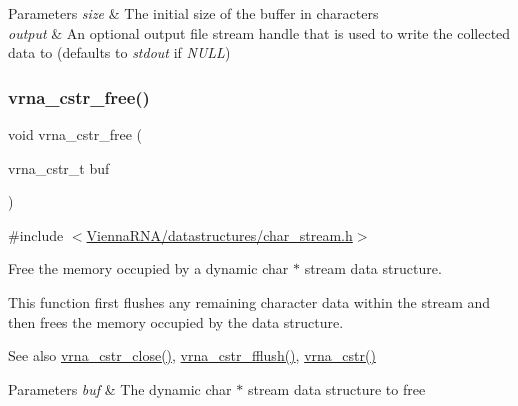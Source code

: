 \begin{DoxyParams}{Parameters}
{\em size} & The initial size of the buffer in characters \\
\hline
{\em output} & An optional output file stream handle that is used to write the collected data to (defaults to {\itshape stdout} if {\itshape N\+U\+LL}) \\
\hline
\end{DoxyParams}
\mbox{\label{group__buffer__utils_ga7ec48ec280f699928c70428cc245dc77}} 
\subsubsection{\texorpdfstring{vrna\_cstr\_free()}{vrna\_cstr\_free()}}
{\footnotesize\ttfamily void vrna\+\_\+cstr\+\_\+free (\begin{DoxyParamCaption}\item[{vrna\+\_\+cstr\+\_\+t}]{buf }\end{DoxyParamCaption})}



{\ttfamily \#include $<$\mbox{\hyperlink{datastructures_2char__stream_8h}{Vienna\+R\+N\+A/datastructures/char\+\_\+stream.\+h}}$>$}



Free the memory occupied by a dynamic char $\ast$ stream data structure. 

This function first flushes any remaining character data within the stream and then free\textquotesingle{}s the memory occupied by the data structure.

\begin{DoxySeeAlso}{See also}
\mbox{\hyperlink{group__buffer__utils_ga5a3f6a0a73b3d2d38fe011cdaed0ad28}{vrna\+\_\+cstr\+\_\+close()}}, \mbox{\hyperlink{group__buffer__utils_gab59ad4781f7de960bdd1af5b1965c94b}{vrna\+\_\+cstr\+\_\+fflush()}}, \mbox{\hyperlink{group__buffer__utils_gadb2818f368e10a3b60a96bb3c80228d2}{vrna\+\_\+cstr()}}
\end{DoxySeeAlso}

\begin{DoxyParams}{Parameters}
{\em buf} & The dynamic char $\ast$ stream data structure to free \\
\hline
\end{DoxyParams}
\mbox{\label{group__buffer__utils_ga5a3f6a0a73b3d2d38fe011cdaed0ad28}} 
